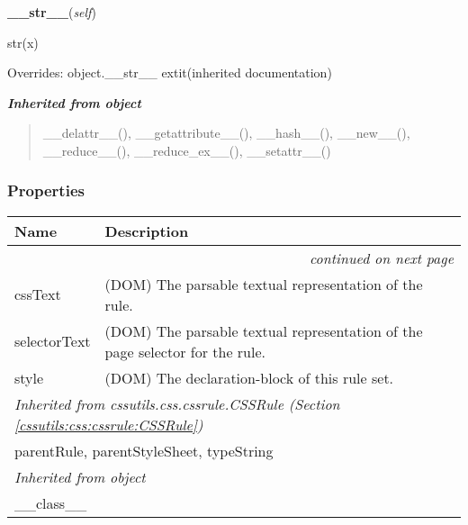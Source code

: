 \hspace{.8\funcindent}\begin{boxedminipage}{\funcwidth}

    \raggedright \textbf{\_\_str\_\_}(\textit{self})

\setlength{\parskip}{2ex}
    str(x)

\setlength{\parskip}{1ex}
      Overrides: object.\_\_str\_\_ 	extit{(inherited documentation)}

    \end{boxedminipage}


\large{\textbf{\textit{Inherited from object}}}

\begin{quote}
\_\_delattr\_\_(), \_\_getattribute\_\_(), \_\_hash\_\_(), \_\_new\_\_(), \_\_reduce\_\_(), \_\_reduce\_ex\_\_(), \_\_setattr\_\_()
\end{quote}


  \subsubsection{Properties}

    \vspace{-1cm}
\hspace{\varindent}\begin{longtable}{|p{\varnamewidth}|p{\vardescrwidth}|l}
\cline{1-2}
\cline{1-2} \centering \textbf{Name} & \centering \textbf{Description}& \\
\cline{1-2}
\endhead\cline{1-2}\multicolumn{3}{r}{\small\textit{continued on next page}}\\\endfoot\cline{1-2}
\endlastfoot\raggedright c\-s\-s\-T\-e\-x\-t\- & \raggedright (DOM) The parsable textual representation of the rule.&\\
\cline{1-2}
\raggedright s\-e\-l\-e\-c\-t\-o\-r\-T\-e\-x\-t\- & \raggedright (DOM) The parsable textual representation of the page selector for the rule.&\\
\cline{1-2}
\raggedright s\-t\-y\-l\-e\- & \raggedright (DOM) The declaration-block of this rule set.&\\
\cline{1-2}
\multicolumn{2}{|l|}{\textit{Inherited from cssutils.css.cssrule.CSSRule \textit{(Section \ref{cssutils:css:cssrule:CSSRule})}}}\\
\multicolumn{2}{|p{\varwidth}|}{\raggedright parentRule, parentStyleSheet, typeString}\\
\cline{1-2}
\multicolumn{2}{|l|}{\textit{Inherited from object}}\\
\multicolumn{2}{|p{\varwidth}|}{\raggedright \_\_class\_\_}\\
\cline{1-2}
\end{longtable}


